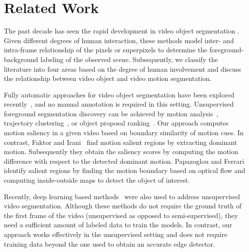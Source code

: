 \documentclass[runningheads]{llncs}
\begin{document}
%
 

\section{Related Work}
\label{sec:related}


The past decade has seen the rapid development in video object segmentation \cite{TsaiBMVC2010,LiICCV13,NagarajaICCV15,PriceICCV09,LezamaCVPR11,LeeICCV11,PapazoglouICCV13,XiaoCVPR16,GrundmannCVPR2010,TsaiCVPR2016,jain2017fusionseg,HuNIPS2017,HuECCV2018b}. 
Given different degrees of human interaction, these methods model inter- and  intra-frame relationship of the pixels or superpixels to determine the foreground-background labeling of the observed scene. Subsequently, we classify the literature into four areas based on the degree of human involvement and discuss the relationship between video object  and video motion segmentation.

Fully automatic approaches for video object segmentation have been explored recently~\cite{ChengCVPR12,LeeICCV11,ZhangCVPR13,PapazoglouICCV13,OchsPAMI2014,FaktorBMVC14,XiaoCVPR16,KohCVPR17}, and no manual annotation is required in this setting. Unsupervised foreground segmentation discovery can be achieved by motion analysis~\cite{PapazoglouICCV13,FaktorBMVC14}, trajectory clustering~\cite{OchsPAMI2014}, or object proposal ranking~\cite{LeeICCV11,XiaoCVPR16}. Our approach computes motion saliency in a given video based on boundary similarity of motion cues. In contrast, Faktor and Irani~\cite{FaktorBMVC14} find motion salient regions by extracting dominant motion. Subsequently they obtain the saliency scores by computing the motion difference with respect to the detected dominant motion. Papazoglou and Ferrari~\cite{PapazoglouICCV13} identify  salient regions by finding the motion boundary based on optical flow and computing  inside-outside maps to detect the object of interest. 

Recently, deep learning based methods~\cite{jain2017fusionseg,TokmakovCVPR2017,Tokmakov17_2} were also used to address unsupervised video segmentation. Although these methods do not require the ground truth of the first frame of the video (unsupervised as opposed to semi-supervised), they need a sufficient amount of labeled data to train the models.
In contrast, our approach works effectively in the unsupervised setting and does not require training data beyond the one used to obtain an accurate edge detector.
\end{document}

